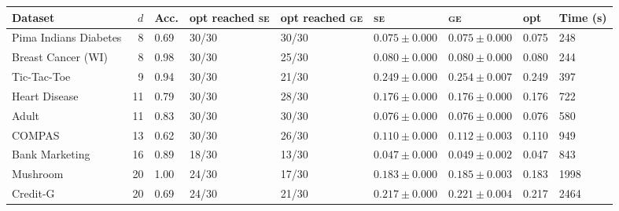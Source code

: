 \begin{tabular}{lrlllllll}
\toprule
Dataset & $d$ & Acc. & opt reached \textsc{se} & opt reached \textsc{ge} & \textsc{se} & \textsc{ge} & opt & Time (s) \\
\midrule
Pima Indians Diabetes & 8 & 0.69 & 30/30 & 30/30 & $0.075 \pm 0.000$ & $0.075 \pm 0.000$ & 0.075 & 248 \\
Breast Cancer (WI) & 8 & 0.98 & 30/30 & 25/30 & $0.080 \pm 0.000$ & $0.080 \pm 0.000$ & 0.080 & 244 \\
Tic-Tac-Toe & 9 & 0.94 & 30/30 & 21/30 & $0.249 \pm 0.000$ & $0.254 \pm 0.007$ & 0.249 & 397 \\
Heart Disease & 11 & 0.79 & 30/30 & 28/30 & $0.176 \pm 0.000$ & $0.176 \pm 0.000$ & 0.176 & 722 \\
Adult & 11 & 0.83 & 30/30 & 30/30 & $0.076 \pm 0.000$ & $0.076 \pm 0.000$ & 0.076 & 580 \\
COMPAS & 13 & 0.62 & 30/30 & 26/30 & $0.110 \pm 0.000$ & $0.112 \pm 0.003$ & 0.110 & 949 \\
Bank Marketing & 16 & 0.89 & 18/30 & 13/30 & $0.047 \pm 0.000$ & $0.049 \pm 0.002$ & 0.047 & 843 \\
Mushroom & 20 & 1.00 & 24/30 & 17/30 & $0.183 \pm 0.000$ & $0.185 \pm 0.003$ & 0.183 & 1998 \\
Credit-G & 20 & 0.69 & 24/30 & 21/30 & $0.217 \pm 0.000$ & $0.221 \pm 0.004$ & 0.217 & 2464 \\
\bottomrule
\end{tabular}
